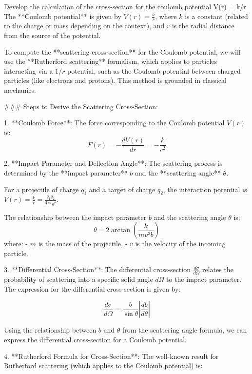 

Develop the calculation of the cross-section for the coulomb potential V(r) = k/r
The **Coulomb potential** is given by \( V(r) = \frac{k}{r} \), where \( k \) is a constant (related to the charge or mass depending on the context), and \( r \) is the radial distance from the source of the potential.

To compute the **scattering cross-section** for the Coulomb potential, we will use the **Rutherford scattering** formalism, which applies to particles interacting via a \( 1/r \) potential, such as the Coulomb potential between charged particles (like electrons and protons). This method is grounded in classical mechanics.

### Steps to Derive the Scattering Cross-Section:

1. **Coulomb Force**:
   The force corresponding to the Coulomb potential \( V(r) \) is:
   \[
   F(r) = -\frac{dV(r)}{dr} = -\frac{k}{r^2}
   \]

2. **Impact Parameter and Deflection Angle**:
   The scattering process is determined by the **impact parameter** \( b \) and the **scattering angle** \( \theta \).

   For a projectile of charge \( q_1 \) and a target of charge \( q_2 \), the interaction potential is \( V(r) = \frac{k}{r} = \frac{q_1 q_2}{4 \pi \epsilon_0 r} \).

   The relationship between the impact parameter \( b \) and the scattering angle \( \theta \) is:
   \[
   \theta = 2 \arctan\left( \frac{k}{mv^2 b} \right)
   \]
   where:
   - \( m \) is the mass of the projectile,
   - \( v \) is the velocity of the incoming particle.

3. **Differential Cross-Section**:
   The differential cross-section \( \frac{d\sigma}{d\Omega} \) relates the probability of scattering into a specific solid angle \( d\Omega \) to the impact parameter. The expression for the differential cross-section is given by:

   \[
   \frac{d\sigma}{d\Omega} = \frac{b}{\sin\theta} \left| \frac{db}{d\theta} \right|
   \]

   Using the relationship between \( b \) and \( \theta \) from the scattering angle formula, we can express the differential cross-section for a Coulomb potential.

4. **Rutherford Formula for Cross-Section**:
   The well-known result for Rutherford scattering (which applies to the Coulomb potential) is:

